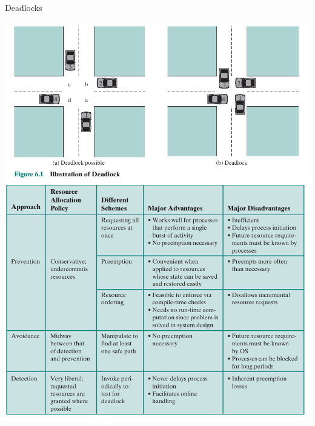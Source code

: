 \documentclass[10pt]{beamer}
\begin{document}
\begin{frame}[allowframebreaks]{Deadlocks}
  \begin{center}
      \includegraphics[keepaspectratio, width=\textwidth, height=\textheight-2\baselineskip-2\baselineskip]{img/023_deadlock.png} \\ \framebreak
      \includegraphics[keepaspectratio, width=\textwidth, height=\textheight-2\baselineskip-2\baselineskip]{img/023_deadlock_fix.png} \\
 \end{center}
\end{frame}
\end{document}
